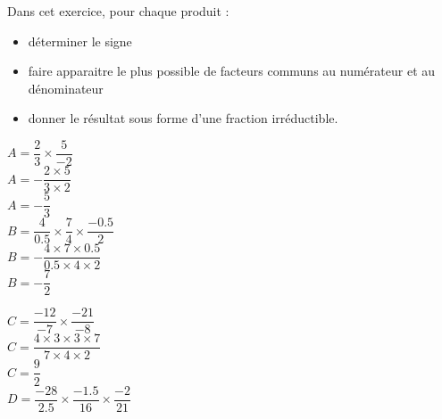 \begin{corrige}
    Dans cet exercice, pour chaque produit :
    \begin{itemize}
        \item déterminer le signe
        \item faire apparaitre le plus possible de facteurs communs au numérateur et au dénominateur
        \item donner le résultat sous forme d'une fraction irréductible.
    \end{itemize}
    \begin{multicols}{2}
        \begin{spacing}{2}        
            \begin{itemize}
                \def\item{}
                \item $A=\dfrac{2}{3}\times \dfrac{5}{-2}$\\
                {\red $A=-\dfrac{2\times 5}{3\times 2}$\\$A=-\dfrac{5}{3}$}\\
                \item $B=\dfrac{4}{\num{0.5}}\times\dfrac{7}{4}\times\dfrac{\num{-0.5}}{2}$\\
                {\red $B=-\dfrac{4\times 7\times\num{0.5}}{\num{0.5}\times 4\times 2}$\\$B=-\dfrac{7}{2}$}\\
            \end{itemize}
        \end{spacing}
    \end{multicols}
    \Coupe
        \begin{spacing}{2}
            \begin{itemize}
                \def\item{}             
                \item $C=\dfrac{-12}{-7}\times\dfrac{-21}{-8}$\\
                {\red $C=\dfrac{4\times 3\times 3\times 7}{7\times 4\times 2}$\\$C=\dfrac{9}{2}$}\\                               
                \item \mbox{$D=\dfrac{-28}{\num{2.5}}\times\dfrac{\num{-1.5}}{16}\times\dfrac{-2}{21}$}\\

\end{itemize}
\end{spacing}
\end{corrige}
